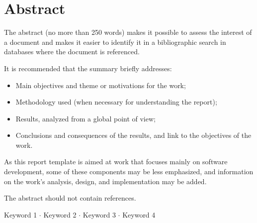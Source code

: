 \chapter*{Abstract}
The abstract (no more than 250 words) makes it possible to assess the interest of a document and makes it easier to identify it in a bibliographic search in databases where the document is referenced. 

It is recommended that the summary briefly addresses:
\begin{itemize}
	\item Main objectives and theme or motivations for the work; 
	\item Methodology used (when necessary for understanding the report); 
	\item Results, analyzed from a global point of view; 
	\item Conclusions and consequences of the results, and link to the objectives of the work.
\end{itemize}

As this report template is aimed at work that focuses mainly on software development, some of these components may be less emphasized, and information on the work's analysis, design, and implementation may be added.

The abstract should not contain references.

\mbox{}\linebreak
{} Keyword 1 $\cdot$ Keyword 2 $\cdot$ Keyword 3 $\cdot$ Keyword 4